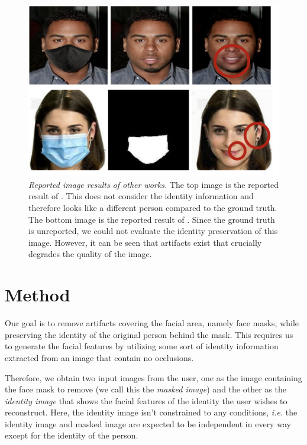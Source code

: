 \documentclass[sigconf,authorversion,nonacm]{acmart}
\begin{document}
\begin{figure}
  \centering
  \includegraphics[width=\linewidth]{images/bad_other.png}
  \caption{\emph{Reported image results of other works.} The top image is the reported result of \cite{STRV-ML}. This does not consider the identity information and therefore looks like a different person compared to the ground truth. The bottom image is the reported result of \cite{GAN-Mask-Removal}. Since the ground truth is unreported, we could not evaluate the identity preservation of this image. However, it can be seen that artifacts exist that crucially degrades the quality of the image.}
  \label{images:bad_other}
\end{figure}

\section{Method}
Our goal is to remove artifacts covering the facial area, namely face masks,
while preserving the identity of the original person behind the mask. This
requires us to generate the facial features by utilizing some sort of identity
information extracted from an image that contain no occlusions.

Therefore, we obtain two input images from the user, one as the image containing
the face mask to remove (we call this the \emph{masked image}) and the other as
the \emph{identity image} that shows the facial features of the identity the
user wishes to reconstruct. Here, the identity image isn't constrained to any
conditions, \emph{i.e.} the identity image and masked image are expected to be
independent in every way except for the identity of the person.
\end{document}
